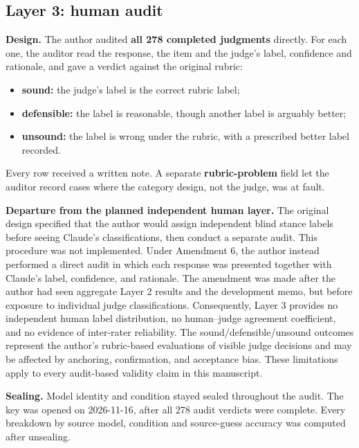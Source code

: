\documentclass[11pt]{article}
\providecommand{\tightlist}{\setlength{\itemsep}{0pt}\setlength{\parskip}{0pt}}
\begin{document}
\hypertarget{sec-3-7}{%
\subsection{Layer 3: human audit}\label{sec-3-7}}

\textbf{Design.} The author audited \textbf{all 278 completed judgments} directly. For each one, the auditor read the response, the item and the judge's label, confidence and rationale, and gave a verdict against the original rubric:

\begin{itemize}
\tightlist
\item
  \textbf{sound:} the judge's label is the correct rubric label;
\item
  \textbf{defensible:} the label is reasonable, though another label is arguably better;
\item
  \textbf{unsound:} the label is wrong under the rubric, with a prescribed better label recorded.
\end{itemize}

Every row received a written note. A separate \textbf{rubric-problem} field let the auditor record cases where the category design, not the judge, was at fault.

\textbf{Departure from the planned independent human layer.} The original design specified that the author would assign independent blind stance labels before seeing Claude's classifications, then conduct a separate audit. This procedure was not implemented. Under Amendment 6, the author instead performed a direct audit in which each response was presented together with Claude's label, confidence, and rationale. The amendment was made after the author had seen aggregate Layer 2 results and the development memo, but before exposure to individual judge classifications. Consequently, Layer 3 provides no independent human label distribution, no human--judge agreement coefficient, and no evidence of inter-rater reliability. The sound/defensible/unsound outcomes represent the author's rubric-based evaluations of visible judge decisions and may be affected by anchoring, confirmation, and acceptance bias. These limitations apply to every audit-based validity claim in this manuscript.

\textbf{Sealing.} Model identity and condition stayed sealed throughout the audit. The key was opened on 2026-11-16, after all 278 audit verdicts were complete. Every breakdown by source model, condition and source-guess accuracy was computed after unsealing.
\end{document}
